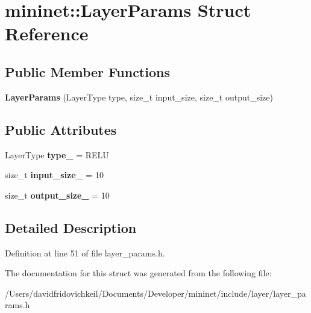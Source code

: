 \hypertarget{structmininet_1_1_layer_params}{}\section{mininet\+:\+:Layer\+Params Struct Reference}
\label{structmininet_1_1_layer_params}
\subsection*{Public Member Functions}
\begin{DoxyCompactItemize}
\item 
\hypertarget{structmininet_1_1_layer_params_a8a553db4487ac7d91127327cc28cd242}{}\label{structmininet_1_1_layer_params_a8a553db4487ac7d91127327cc28cd242} 
{\bfseries Layer\+Params} (Layer\+Type type, size\+\_\+t input\+\_\+size, size\+\_\+t output\+\_\+size)
\end{DoxyCompactItemize}
\subsection*{Public Attributes}
\begin{DoxyCompactItemize}
\item 
\hypertarget{structmininet_1_1_layer_params_afe73b1c539544ca3e280d3e5dd222007}{}\label{structmininet_1_1_layer_params_afe73b1c539544ca3e280d3e5dd222007} 
Layer\+Type {\bfseries type\+\_\+} = R\+E\+LU
\item 
\hypertarget{structmininet_1_1_layer_params_af572460aed17881f265fefec48bdba76}{}\label{structmininet_1_1_layer_params_af572460aed17881f265fefec48bdba76} 
size\+\_\+t {\bfseries input\+\_\+size\+\_\+} = 10
\item 
\hypertarget{structmininet_1_1_layer_params_ab3c57b124160125c98e5a960cf653efc}{}\label{structmininet_1_1_layer_params_ab3c57b124160125c98e5a960cf653efc} 
size\+\_\+t {\bfseries output\+\_\+size\+\_\+} = 10
\end{DoxyCompactItemize}


\subsection{Detailed Description}


Definition at line 51 of file layer\+\_\+params.\+h.



The documentation for this struct was generated from the following file\+:\begin{DoxyCompactItemize}
\item 
/\+Users/davidfridovichkeil/\+Documents/\+Developer/mininet/include/layer/layer\+\_\+params.\+h\end{DoxyCompactItemize}
